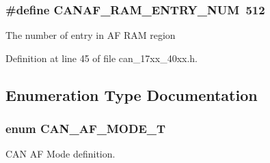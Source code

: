 \subsubsection[{\texorpdfstring{C\+A\+N\+A\+F\+\_\+\+R\+A\+M\+\_\+\+E\+N\+T\+R\+Y\+\_\+\+N\+UM}{CANAF_RAM_ENTRY_NUM}}]{\setlength{\rightskip}{0pt plus 5cm}\#define C\+A\+N\+A\+F\+\_\+\+R\+A\+M\+\_\+\+E\+N\+T\+R\+Y\+\_\+\+N\+UM~512}\hypertarget{group__CAN__17XX__40XX_ga79546dad61d5645789e339371e9f491f}{}\label{group__CAN__17XX__40XX_ga79546dad61d5645789e339371e9f491f}
The number of entry in AF R\+AM region 

Definition at line 45 of file can\+\_\+17xx\+\_\+40xx.\+h.



\subsection{Enumeration Type Documentation}
\subsubsection[{\texorpdfstring{C\+A\+N\+\_\+\+A\+F\+\_\+\+M\+O\+D\+E\+\_\+T}{CAN_AF_MODE_T}}]{\setlength{\rightskip}{0pt plus 5cm}enum {\bf C\+A\+N\+\_\+\+A\+F\+\_\+\+M\+O\+D\+E\+\_\+T}}\hypertarget{group__CAN__17XX__40XX_gaf9abd01ef9ba38a2113a240871e9b48a}{}\label{group__CAN__17XX__40XX_gaf9abd01ef9ba38a2113a240871e9b48a}


C\+AN AF Mode definition. 

